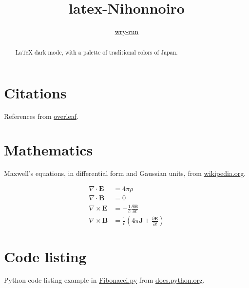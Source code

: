 \documentclass[a4paper]{paper}
\begin{document}
\title{latex-Nihonnoiro}

\author{\href{https://github.com/wry-run}{wry-run}}

\maketitle
\begin{abstract}
	LaTeX dark mode, with a palette of traditional colors of Japan.
\end{abstract}

\tableofcontents



\section{Citations}
\label{sec:citations}

References \cite{texbook, latex:companion, latex2e, knuth:1984, lesk:1977} from \href{https://www.overleaf.com/learn/latex/Bibliography_management_with_bibtex}{overleaf}.


\section{Mathematics}
\label{sec:mathematics}

Maxwell's equations, in differential form and Gaussian units, from \href{https://en.wikipedia.org/wiki/Maxwell's_equations}{wikipedia.org}.

\begin{align}
	\nabla \cdot \mathbf {E} &= 4\pi \rho	\\
	\nabla \cdot \mathbf {B} &= 0	\\
	\nabla \times \mathbf {E} &= -{\frac {1}{c}}{\frac {\partial \mathbf {B} }{\partial t}}	\\
	\nabla \times \mathbf {B} &= \frac {1}{c}\left(4\pi \mathbf {J} +\frac {\partial \mathbf {E} }{\partial t}\right)
\end{align}

\section{Code listing}
\label{sec:listing}

Python code listing example in \href{file:Fibonacci.py}{Fibonacci.py} from \href{https://docs.python.org/3/tutorial/introduction.html#first-steps-towards-programming}{docs.python.org}.


\end{document}
